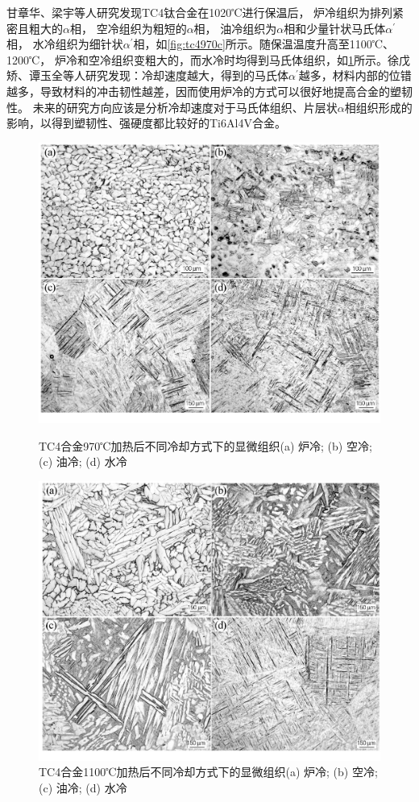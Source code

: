 \documentclass[
class = book,
zihao = -4,
font = noto,
paper = a4paper,
openany
]{easybook}
\newcommand{\ti}{Ti6Al4V}
\begin{document}
甘章华、梁宇等人研究发现\cite{ganzhanghuaRechuligongyiduiTC4taihejinzuzhijiyingdudeyingxiang2014}TC4钛合金在1020℃进行保温后， 炉冷组织为排列紧密且粗大的$\alpha $相， 空冷组织为粗短的$\alpha $相， 油冷组织为$\alpha $相和少量针状马氏体$\alpha^{\prime}$相， 水冷组织为细针状$\alpha^{\prime}$相，如\ref{fig:tc4970c}所示。随保温温度升高至1100℃、1200℃， 炉冷和空冷组织变粗大的，而水冷时均得到马氏体组织，如\ref{fig:tc41100c}所示。徐戊矫、谭玉全等人研究\cite{xuwujiaoTuihuowenduhelengquesushuaiduiTC4taihejinzuzhihexingnengdeyingxiang2016}发现：冷却速度越大，得到的马氏体$ \alpha^{\prime} $越多，材料内部的位错越多，导致材料的冲击韧性越差，因而使用炉冷的方式可以很好地提高合金的塑韧性。 未来的研究方向应该是分析冷却速度对于马氏体组织、片层状$ \alpha $相组织形成的影响，以得到塑韧性、强硬度都比较好的\ti 合金。
\begin{figure}[htbp]
	\centering
	\begin{minipage}[t]{0.48\textwidth}
	\centering
	\includegraphics[width=0.7\linewidth]{TC4合金970℃加热后不同冷却方式下的显微组织}
\caption{TC4合金970℃加热后不同冷却方式下的显微组织\cite{ganzhanghuaRechuligongyiduiTC4taihejinzuzhijiyingdudeyingxiang2014}(a) 炉冷; (b) 空冷; (c) 油冷; (d) 水冷}
\label{fig:tc4970c}
	\end{minipage}
	\begin{minipage}[t]{0.48\textwidth}
	\centering
\includegraphics[width=0.7\linewidth]{TC4合金1100℃加热后不同冷却方式下的显微组织}
\caption{TC4合金1100℃加热后不同冷却方式下的显微组织(a) 炉冷; (b) 空冷; (c) 油冷; (d) 水冷}
\label{fig:tc41100c}
	\end{minipage}
\end{figure}
\end{document}
